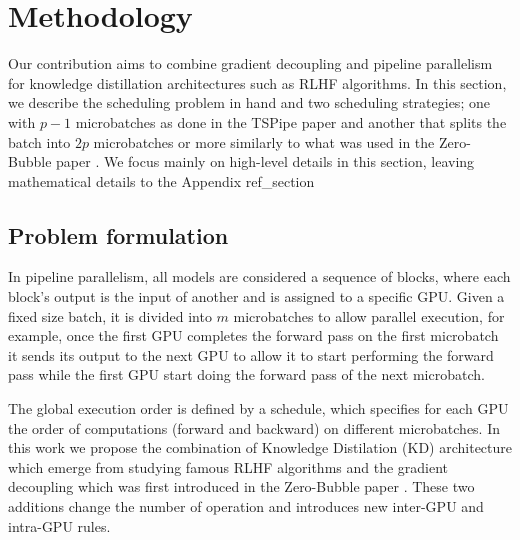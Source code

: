 \documentclass{article}
\begin{document}





\section{Methodology}
Our contribution aims to combine gradient decoupling and pipeline parallelism for knowledge distillation architectures such as RLHF algorithms. In this section, we describe the scheduling problem in hand and two scheduling strategies; one with $p-1$ microbatches as done in the TSPipe paper \cite{} and another that splits the batch into $2p$ microbatches or more similarly to what was used in the Zero-Bubble paper \cite{}. We focus mainly on high-level details in this section, leaving mathematical details to the Appendix ref\_section



\subsection{Problem formulation}
In pipeline parallelism, all models are considered a sequence of blocks, where each block's output is the input of another and is assigned to a specific GPU. Given a fixed size batch, it is divided into $m$ microbatches to allow parallel execution, for example, once the first GPU completes the forward pass on the first microbatch it sends its output to the next GPU to allow it to start performing the forward pass while the first GPU start doing the forward pass of the next microbatch.


The global execution order is defined by a schedule, which specifies for each GPU the order of computations (forward and backward) on different microbatches. In this work we propose the combination of Knowledge Distilation (KD) architecture which emerge from studying famous RLHF algorithms and the gradient decoupling which was first introduced in the Zero-Bubble paper \cite{}. These two additions change the number of operation and introduces new inter-GPU and intra-GPU rules.
\end{document}
